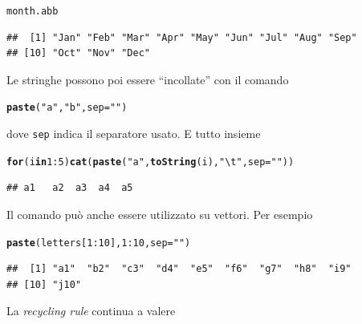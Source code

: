 \documentclass[onecolumn,12pt]{book}\usepackage[]{graphicx}\usepackage[]{color}
\makeatletter
\newcommand{\hlnum}[1]{\textcolor[rgb]{0.686,0.059,0.569}{#1}}%
\newcommand{\hlstr}[1]{\textcolor[rgb]{0.192,0.494,0.8}{#1}}%
\newcommand{\hlopt}[1]{\textcolor[rgb]{0,0,0}{#1}}%
\newcommand{\hlstd}[1]{\textcolor[rgb]{0.345,0.345,0.345}{#1}}%
\newcommand{\hlkwa}[1]{\textcolor[rgb]{0.161,0.373,0.58}{\textbf{#1}}}%
\newcommand{\hlkwc}[1]{\textcolor[rgb]{0.333,0.667,0.333}{#1}}%
\newcommand{\hlkwd}[1]{\textcolor[rgb]{0.737,0.353,0.396}{\textbf{#1}}}%
\newenvironment{kframe}{%
 \def\at@end@of@kframe{}%
 \ifinner\ifhmode%
  \def\at@end@of@kframe{\end{minipage}}%
  \begin{minipage}{\columnwidth}%
 \fi\fi%
 \def\FrameCommand##1{\hskip\@totalleftmargin \hskip-\fboxsep
 \colorbox{shadecolor}{##1}\hskip-\fboxsep
     \hskip-\linewidth \hskip-\@totalleftmargin \hskip\columnwidth}%
 \MakeFramed {\advance\hsize-\width
   \@totalleftmargin\z@ \linewidth\hsize
   \@setminipage}}%
 {\par\unskip\endMakeFramed%
 \at@end@of@kframe}
\newenvironment{knitrout}{}{} %
\makeatother
\begin{document}
\begin{knitrout}
\color{fgcolor}\begin{kframe}
\begin{alltt}
\hlstd{month.abb}
\end{alltt}
\begin{verbatim}
##  [1] "Jan" "Feb" "Mar" "Apr" "May" "Jun" "Jul" "Aug" "Sep"
## [10] "Oct" "Nov" "Dec"
\end{verbatim}
\end{kframe}
\end{knitrout}
Le stringhe possono poi essere ``incollate'' con il comando
\begin{knitrout}
\color{fgcolor}\begin{kframe}
\begin{alltt}
\hlkwd{paste}\hlstd{(}\hlstr{"a"}\hlstd{,}\hlstr{"b"}\hlstd{,}\hlkwc{sep}\hlstd{=}\hlstr{""}\hlstd{)}
\end{alltt}
\end{kframe}
\end{knitrout}
dove \texttt{sep}  indica il separatore usato.
E tutto insieme


\begin{knitrout}
\color{fgcolor}\begin{kframe}
\begin{alltt}
\hlkwa{for} \hlstd{(i} \hlkwa{in} \hlnum{1}\hlopt{:}\hlnum{5}\hlstd{)} \hlkwd{cat}\hlstd{(}\hlkwd{paste}\hlstd{(}\hlstr{"a"}\hlstd{,}\hlkwd{toString}\hlstd{(i),}\hlstr{"\textbackslash{}t"}\hlstd{,}\hlkwc{sep}\hlstd{=}\hlstr{""}\hlstd{))}
\end{alltt}
\begin{verbatim}
## a1	a2	a3	a4	a5	
\end{verbatim}
\end{kframe}
\end{knitrout}
Il comando pu\`o anche essere utilizzato su vettori.
Per esempio
\begin{knitrout}
\color{fgcolor}\begin{kframe}
\begin{alltt}
\hlkwd{paste}\hlstd{(letters[}\hlnum{1}\hlopt{:}\hlnum{10}\hlstd{],}\hlnum{1}\hlopt{:}\hlnum{10}\hlstd{,}\hlkwc{sep}\hlstd{=}\hlstr{""}\hlstd{)}
\end{alltt}
\begin{verbatim}
##  [1] "a1"  "b2"  "c3"  "d4"  "e5"  "f6"  "g7"  "h8"  "i9" 
## [10] "j10"
\end{verbatim}
\end{kframe}
\end{knitrout}
La \textit{recycling rule} continua a valere
\end{document}
